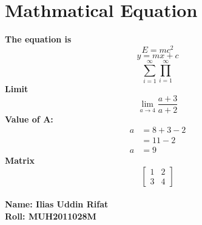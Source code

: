 \documentclass{article}
\begin{document}
\section{Mathmatical Equation}
\textbf{The equation is}
$$E=mc^2$$
\begin{equation}
    y=mx+c
\end{equation}
\begin{equation}
    \sum_{i=1}^{\infty}
    \prod_{i=1}^{\infty}
\end{equation}
\textbf{Limit}
\begin{equation}
    \lim_{a \to 4}
    \frac{a+3}{a+2}
\end{equation}
\textbf{Value of A:}
\begin{equation}
    \begin{split}
        a & = 8+3-2 \\
         &=11-2\\
         a & =9
    \end{split}
\end{equation}
\textbf{Matrix}
\begin{equation}
\begin{bmatrix}
1 & 2 \\
3 & 4
\end{bmatrix}
\end{equation}\\
\textbf{Name: Ilias Uddin Rifat}\\
\textbf{Roll: MUH2011028M}
\end{document}
